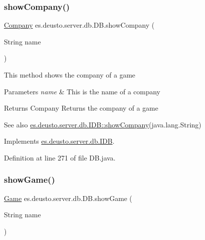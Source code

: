 \subsubsection{\texorpdfstring{show\+Company()}{showCompany()}}
{\footnotesize\ttfamily \hyperlink{classes_1_1deusto_1_1server_1_1db_1_1data_1_1_company}{Company} es.\+deusto.\+server.\+db.\+D\+B.\+show\+Company (\begin{DoxyParamCaption}\item[{String}]{name }\end{DoxyParamCaption})}

This method shows the company of a game 
\begin{DoxyParams}{Parameters}
{\em name} & This is the name of a company \\
\hline
\end{DoxyParams}
\begin{DoxyReturn}{Returns}
Company Returns the company of a game 
\end{DoxyReturn}
\begin{DoxySeeAlso}{See also}
\hyperlink{interfacees_1_1deusto_1_1server_1_1db_1_1_i_d_b_a1681e29b5fbe4377b19e67fa939b2782}{es.\+deusto.\+server.\+db.\+I\+D\+B\+::show\+Company}(java.\+lang.\+String) 
\end{DoxySeeAlso}


Implements \hyperlink{interfacees_1_1deusto_1_1server_1_1db_1_1_i_d_b_a1681e29b5fbe4377b19e67fa939b2782}{es.\+deusto.\+server.\+db.\+I\+DB}.



Definition at line 271 of file D\+B.\+java.

\mbox{\label{classes_1_1deusto_1_1server_1_1db_1_1_d_b_adba76c20f2fc7ed01d486564d881a718}} 
\subsubsection{\texorpdfstring{show\+Game()}{showGame()}}
{\footnotesize\ttfamily \hyperlink{classes_1_1deusto_1_1server_1_1db_1_1data_1_1_game}{Game} es.\+deusto.\+server.\+db.\+D\+B.\+show\+Game (\begin{DoxyParamCaption}\item[{String}]{name }\end{DoxyParamCaption})}

